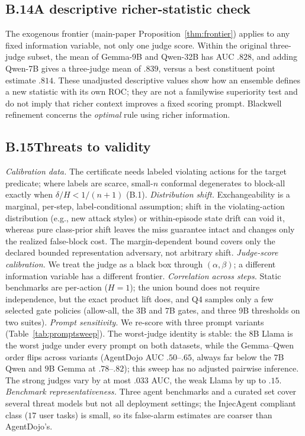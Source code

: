 \subsection*{B.14\quad A descriptive richer-statistic check}
The exogenous frontier (main-paper Proposition~\ref{thm:frontier}) applies to any fixed information variable, not only one
judge score. Within the original three-judge subset, the mean of Gemma-9B and
Qwen-32B has AUC $.828$, and adding Qwen-7B gives a three-judge mean of $.839$, versus a best
constituent point estimate $.814$. These unadjusted descriptive values show how
an ensemble defines a new statistic with its own ROC; they are not a
familywise superiority test and do not imply that richer context improves a
fixed scoring prompt. Blackwell refinement concerns the \emph{optimal} rule
using richer information.

\subsection*{B.15\quad Threats to validity}
\emph{Calibration data.} The certificate needs labeled violating actions for the
target predicate; where labels are scarce, small-$n$ conformal degenerates to
block-all exactly when $\delta/H<1/(n{+}1)$ (B.1). \emph{Distribution shift.}
Exchangeability is a marginal, per-step, label-conditional assumption; shift in
the violating-action distribution (e.g., new attack styles) or within-episode state
drift can void it, whereas pure class-prior shift leaves the miss guarantee intact
and changes only the realized false-block cost. The margin-dependent bound covers only
the declared bounded representation adversary, not arbitrary shift.
\emph{Judge-score calibration.} We treat the judge as a black box through
$(\alpha,\beta)$; a different information variable has a different frontier.
\emph{Correlation across steps.} Static benchmarks are per-action ($H=1$);
the union bound does not require independence, but the exact product lift does,
and Q4 samples only a few selected gate policies (allow-all, the 3B and 7B gates, and three 9B thresholds on two suites). \emph{Prompt sensitivity.}
We re-score with three prompt variants
(Table~\ref{tab:promptsweep}). The worst-judge identity is stable: the $8$B
Llama is the worst judge under every prompt on both datasets, while the Gemma--Qwen order flips across variants (AgentDojo AUC
$.50$--$.65$, always far below the $7$B Qwen and $9$B Gemma at $.78$--$.82$);
this sweep has no adjusted pairwise inference. The strong judges vary by
at most $.033$ AUC, the weak Llama by up to $.15$. \emph{Benchmark representativeness.}
Three agent benchmarks and a curated set cover several threat models but not all
deployment settings; the InjecAgent compliant class ($17$ user tasks) is small, so
its false-alarm estimates are coarser than AgentDojo's.

